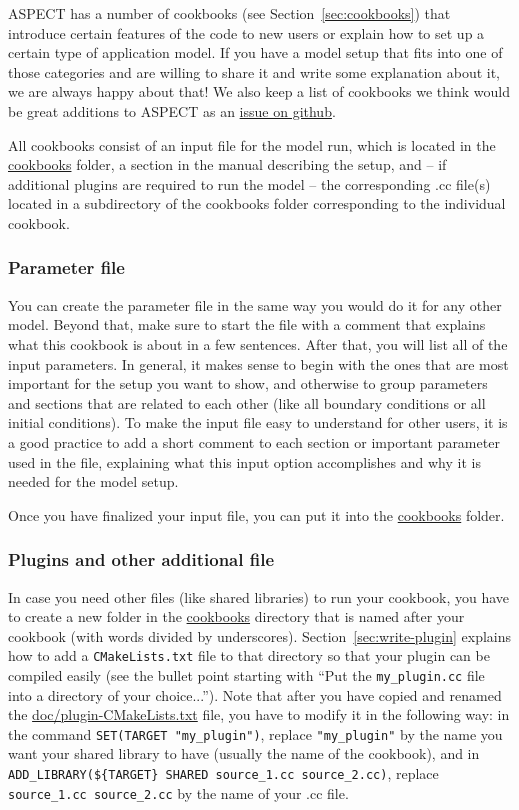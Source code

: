\documentclass{article}
\newcommand{\aspect}{\textsc{ASPECT}}
\begin{document}
\aspect{} has a number of cookbooks (see Section~\ref{sec:cookbooks}) that introduce certain features of the code
to new users or explain how to set up a certain type of application model.
If you have a model setup that fits into one of those categories and are willing
to share it and write some explanation about it, we are always happy about that!
We also keep a list of cookbooks we think would be great additions to \aspect{} as
an \href{https://github.com/geodynamics/aspect/issues/2110}{issue on github}.

All cookbooks consist of an input file for the model run, which is located in the
\href{cookbooks/.}{cookbooks} folder, a section in
the manual describing the setup, and -- if additional plugins are required to run the
model -- the corresponding .cc file(s) located in a subdirectory of the cookbooks
folder corresponding to the individual cookbook.

\subsubsection{Parameter file}

You can create the parameter file in the same way you would do it for any other model.
Beyond that, make sure to start the file with a comment that explains what this cookbook
is about in a few sentences. After that, you will list all of the input parameters.
In general, it makes sense to begin with the ones that are most important for the
setup you want to show, and otherwise to group parameters and sections that are related to
each other (like all boundary conditions or all initial conditions).
To make the input file easy to understand for other users, it is a good practice to
add a short comment to each section or important parameter used in the file, explaining
what this input option accomplishes and why it is needed for the model setup.

Once you have finalized your input file, you can put it into the \href{cookbooks/.}{cookbooks} folder.

\subsubsection{Plugins and other additional file}

In case you need other files (like shared libraries) to run your cookbook, you have to create a
new folder in the \href{cookbooks/.}{cookbooks} directory that is named after your cookbook
(with words divided by underscores).
Section~\ref{sec:write-plugin} explains how to add a \texttt{CMakeLists.txt} file to that
directory so that your plugin can be compiled easily (see the bullet point starting with
``Put the  \texttt{my\_plugin.cc} file into a directory of your choice...'').
Note that after you have copied and renamed the \url{doc/plugin-CMakeLists.txt} file,
you have to modify it in the following way: in the command \verb!SET(TARGET "my_plugin")!,
replace \verb!"my_plugin"! by the name you want your shared library to have (usually the name of the cookbook), and in
\verb!ADD_LIBRARY(${TARGET} SHARED source_1.cc source_2.cc)!, replace \verb!source_1.cc source_2.cc!
by the name of your .cc file.
\end{document}
